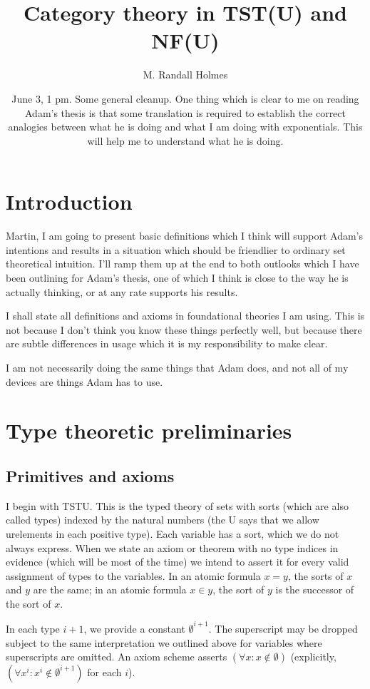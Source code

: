 \documentclass[12pt]{article}
\title{Category theory in TST(U) and NF(U)}
\author{M. Randall Holmes}
\date{June 3, 1  pm.  Some general cleanup.  One thing which is clear to me on reading Adam's thesis is that some translation is required to establish the correct analogies between what he is doing and what I am doing with exponentials.  This will help me to understand what he is doing.}
\begin{document}
\maketitle

\section{Introduction}

Martin, I am going to present basic definitions which I think will support Adam's intentions and results in a situation which should be friendlier to ordinary set theoretical intuition.
I'll ramp them up at the end to both outlooks which I have been outlining for Adam's thesis, one of which I think is close to the way he is actually thinking, or at any rate supports his results.


I shall state all definitions and axioms in foundational theories I am using.  This is not because I don't think you know these things perfectly well, but because there are subtle differences in usage which it is my responsibility to make clear.

I am not necessarily doing the same things that Adam does, and not all of my devices are things Adam has to use.

\section{Type theoretic preliminaries}

\subsection{Primitives and axioms}

I begin with TSTU.  This is the typed theory of sets with sorts (which are also called types) indexed by the natural numbers (the U says that we allow urelements in each positive type).  Each variable has a sort, which we do not always express.  When we
state an axiom or theorem with no type indices in evidence (which will be most of the time) we intend to assert it for every valid assignment of types to the variables.
In an atomic formula $x = y$, the sorts of $x$ and $y$ are the same;  in an atomic formula $x \in y$, the sort of $y$ is the successor of the sort of $x$.

In each type $i+1$, we provide a constant $\emptyset^{i+1}$.  The superscript may be dropped subject to the same interpretation we outlined above for variables where superscripts are omitted.  An axiom scheme asserts $(\forall x:x \not\in \emptyset)$ (explicitly,  $(\forall x^i:x^i \not\in \emptyset^{i+1})$ for each $i$).  
\end{document}
